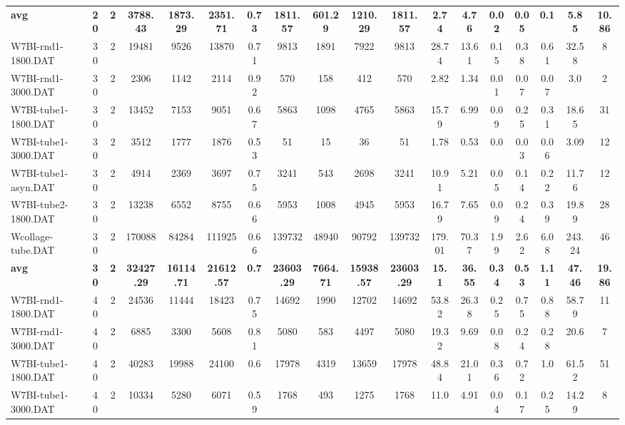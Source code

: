 \begin{sidewaystable}[h]
{\begin{tabular}{lccccccccccccccccc}
\cline{1-18} \textbf{avg} & \textbf{20} & \textbf{2} & \textbf{3788.43} & \textbf{1873.29} & \textbf{2351.71} & \textbf{0.73} & \textbf{1811.57} & \textbf{601.29} & \textbf{1210.29} & \textbf{1811.57} & \textbf{2.74} & \textbf{4.76} & \textbf{0.02} & \textbf{0.05} & \textbf{0.1} & \textbf{5.85} & \textbf{10.86} \\ \cline{1-18}
W7BI-rnd1-1800.DAT & 30 & 2 & 19481 & 9526 & 13870 & 0.71 & 9813 & 1891 & 7922 & 9813 & 28.74 & 13.61 & 0.15 & 0.38 & 0.61 & 32.58 & 8\\
W7BI-rnd1-3000.DAT & 30 & 2 & 2306 & 1142 & 2114 & 0.92 & 570 & 158 & 412 & 570 & 2.82 & 1.34 & 0.01 & 0.07 & 0.07 & 3.0 & 2\\
W7BI-tube1-1800.DAT & 30 & 2 & 13452 & 7153 & 9051 & 0.67 & 5863 & 1098 & 4765 & 5863 & 15.79 & 6.99 & 0.09 & 0.25 & 0.31 & 18.65 & 31\\
W7BI-tube1-3000.DAT & 30 & 2 & 3512 & 1777 & 1876 & 0.53 & 51 & 15 & 36 & 51 & 1.78 & 0.53 & 0.0 & 0.03 & 0.06 & 3.09 & 12\\
W7BI-tube1-asyn.DAT & 30 & 2 & 4914 & 2369 & 3697 & 0.75 & 3241 & 543 & 2698 & 3241 & 10.91 & 5.21 & 0.05 & 0.14 & 0.22 & 11.76 & 12\\
W7BI-tube2-1800.DAT & 30 & 2 & 13238 & 6552 & 8755 & 0.66 & 5953 & 1008 & 4945 & 5953 & 16.79 & 7.65 & 0.09 & 0.24 & 0.39 & 19.89 & 28\\
Wcollage-tube.DAT & 30 & 2 & 170088 & 84284 & 111925 & 0.66 & 139732 & 48940 & 90792 & 139732 & 179.01 & 70.37 & 1.99 & 2.62 & 6.08 & 243.24 & 46\\
\cline{1-18} \textbf{avg} & \textbf{30} & \textbf{2} & \textbf{32427.29} & \textbf{16114.71} & \textbf{21612.57} & \textbf{0.7} & \textbf{23603.29} & \textbf{7664.71} & \textbf{15938.57} & \textbf{23603.29} & \textbf{15.1} & \textbf{36.55} & \textbf{0.34} & \textbf{0.53} & \textbf{1.11} & \textbf{47.46} & \textbf{19.86} \\ \cline{1-18}
W7BI-rnd1-1800.DAT & 40 & 2 & 24536 & 11444 & 18423 & 0.75 & 14692 & 1990 & 12702 & 14692 & 53.82 & 26.38 & 0.25 & 0.75 & 0.88 & 58.79 & 11\\
W7BI-rnd1-3000.DAT & 40 & 2 & 6885 & 3300 & 5608 & 0.81 & 5080 & 583 & 4497 & 5080 & 19.32 & 9.69 & 0.08 & 0.24 & 0.28 & 20.6 & 7\\
W7BI-tube1-1800.DAT & 40 & 2 & 40283 & 19988 & 24100 & 0.6 & 17978 & 4319 & 13659 & 17978 & 48.84 & 21.01 & 0.36 & 0.72 & 1.0 & 61.52 & 51\\
W7BI-tube1-3000.DAT & 40 & 2 & 10334 & 5280 & 6071 & 0.59 & 1768 & 493 & 1275 & 1768 & 11.0 & 4.91 & 0.04 & 0.17 & 0.25 & 14.29 & 8\\

\end{tabular}}
\end{sidewaystable}

